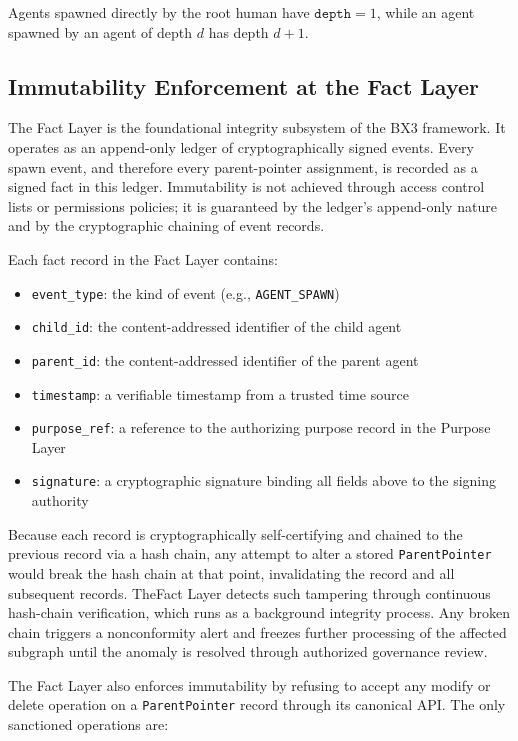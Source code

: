 Agents spawned directly by the root human have $\texttt{depth} = 1$, while
an agent spawned by an agent of depth $d$ has depth $d + 1$.

\subsection{Immutability Enforcement at the Fact Layer}

The Fact Layer is the foundational integrity subsystem of the BX3 framework.
It operates as an append-only ledger of cryptographically signed events.
Every spawn event, and therefore every parent-pointer assignment, is recorded
as a signed fact in this ledger. Immutability is not achieved through access
control lists or permissions policies; it is guaranteed by the ledger's
append-only nature and by the cryptographic chaining of event records.

Each fact record in the Fact Layer contains:

\begin{itemize}
  \item \texttt{event\_type}: the kind of event (e.g., \texttt{AGENT\_SPAWN})
  \item \texttt{child\_id}: the content-addressed identifier of the child agent
  \item \texttt{parent\_id}: the content-addressed identifier of the parent agent
  \item \texttt{timestamp}: a verifiable timestamp from a trusted time source
  \item \texttt{purpose\_ref}: a reference to the authorizing purpose record
        in the Purpose Layer
  \item \texttt{signature}: a cryptographic signature binding all fields above
        to the signing authority
\end{itemize}

Because each record is cryptographically self-certifying and chained to the
previous record via a hash chain, any attempt to alter a stored
\texttt{ParentPointer} would break the hash chain at that point, invalidating
the record and all subsequent records. TheFact Layer detects such tampering
through continuous hash-chain verification, which runs as a background
integrity process. Any broken chain triggers a nonconformity alert and
freezes further processing of the affected subgraph until the anomaly is
resolved through authorized governance review.

The Fact Layer also enforces immutability by refusing to accept any
modify or delete operation on a \texttt{ParentPointer} record through its
canonical API. The only sanctioned operations are:


